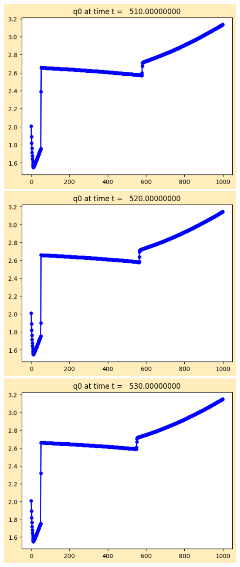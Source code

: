 \documentclass[11pt]{article}
\begin{document}
\vskip 10pt 
\includegraphics[width=0.95\textwidth]{frame0051fig1.png}
\vskip 10pt 
\includegraphics[width=0.95\textwidth]{frame0052fig1.png}
\vskip 10pt 
\includegraphics[width=0.95\textwidth]{frame0053fig1.png}
\end{document}
